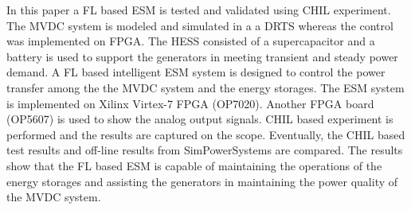 In this paper a FL based ESM is tested and validated using CHIL experiment. The MVDC system is modeled and simulated in a a DRTS whereas the control was implemented on FPGA. The HESS consisted of a supercapacitor and a battery is used to support the generators in meeting transient and steady power demand. A FL based intelligent ESM system is designed to control the power transfer among the the MVDC system and the energy storages. The ESM system is implemented on Xilinx Virtex-7 FPGA (OP7020). Another FPGA board (OP5607) is used to show the analog output signals. CHIL based experiment is performed and the results are captured on the scope. Eventually, the CHIL based test results and off-line results from SimPowerSystems are compared. The results show that the FL based ESM is capable of maintaining the operations of the energy storages and assisting the generators in maintaining the power quality of the MVDC system.   

